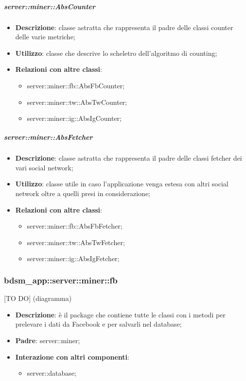 		\subparagraph{server::miner::AbsCounter} %
		\label{subp:server_miner_AbsCounter}
			\begin{itemize}
				\item \textbf{Descrizione}: classe astratta che rappresenta il padre delle classi counter delle varie metriche;
				\item \textbf{Utilizzo}: classe che descrive lo scheletro dell'algoritmo di counting;
				\item \textbf{Relazioni con altre classi}:
					\begin{itemize}
						\item server::miner::fb::AbsFbCounter;
						\item server::miner::tw::AbsTwCounter;
						\item server::miner::ig::AbsIgCounter;
					\end{itemize}
			\end{itemize}
		
		\subparagraph{server::miner::AbsFetcher} %
		\label{subp:server_miner_AbsFetcher}
				\begin{itemize}
				\item \textbf{Descrizione}: classe astratta che rappresenta il padre delle classi fetcher dei vari social network;
				\item \textbf{Utilizzo}: classe utile in caso l'applicazione venga estesa con altri social network oltre a quelli presi in considerazione;
				\item \textbf{Relazioni con altre classi}:
					\begin{itemize}
						\item server::miner::fb::AbsFbFetcher;
						\item server::miner::tw::AbsTwFetcher;
						\item server::miner::ig::AbsIgFetcher;
					\end{itemize}
			\end{itemize}
		
\subsubsection{bdsm\_app::server::miner::fb} %
\label{ssub:bdsm_app_server_miner_fb}
[TO DO] (diagramma) \newline \newline

\begin{itemize}
  \item \textbf{Descrizione}: è il package che contiene tutte le classi con i metodi per prelevare i dati da Facebook e per salvarli nel database;
  \item \textbf{Padre}: server::miner;
  \item \textbf{Interazione con altri componenti}:
  	\begin{itemize}
  		\item server::database;
  	\end{itemize}
\end{itemize}	

